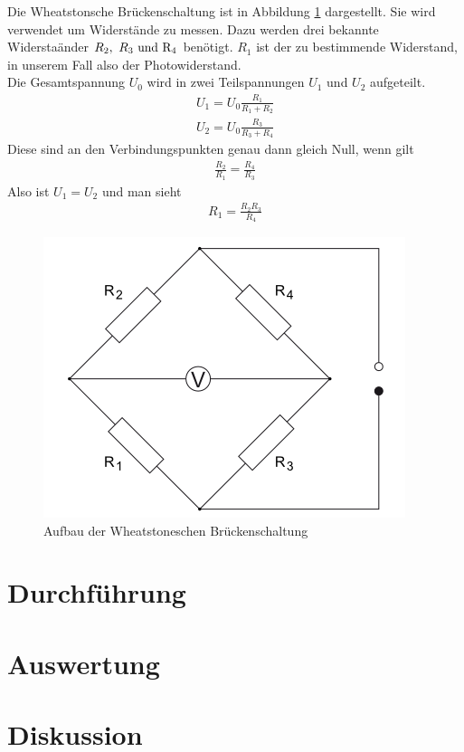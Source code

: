 \documentclass[12pt, a4paper, twoside]{scrartcl}
\begin{document}
Die Wheatstonsche Brückenschaltung ist in Abbildung \ref{img:schaltung} dargestellt. Sie wird verwendet um Widerstände zu messen. Dazu werden drei bekannte Widerstaänder $R_2,\ R_3\ \rm{und}\ R_4$ benötigt. $R_1$ ist der zu bestimmende Widerstand, in unserem Fall also der Photowiderstand. \\

Die Gesamtspannung $U_0$ wird in zwei Teilspannungen $U_1$ und $U_2$ aufgeteilt.
\begin{align*}
U_1=U_0\frac{R_1}{R_1+R_2} \\
U_2=U_0\frac{R_3}{R_3+R_4}
\end{align*}
Diese sind an den Verbindungspunkten genau dann gleich Null, wenn gilt
\begin{align*}
\frac{R_2}{R_1}=\frac{R_4}{R_3} 
\end{align*}
Also ist $U_1=U_2$ und man sieht
\begin{align}
R_1=\frac{R_2R_3}{R_4}
\end{align}


\begin{figure} [h]
\centering
\includegraphics[scale=0.8]{schaltung.png}
\caption{\label{img:schaltung}Aufbau der Wheatstoneschen Brückenschaltung\protect\footnotemark}
\end{figure}

\section{Durchführung}
\label{sec:durchfuehrung}



\section{Auswertung}
\label{sec:auswertung}



\section{Diskussion}
\label{sec:diskussion}
\end{document}
